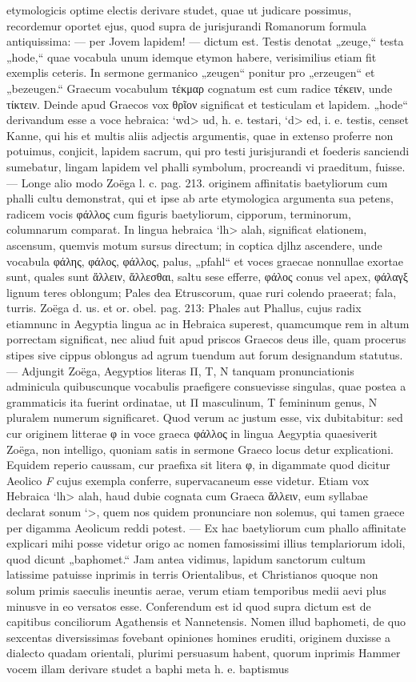 \documentclass[a4paper, 11pt, oneside, polutonikogreek, german]{article}
\begin{document}
etymologicis optime electis derivare studet, quae ut judicare possimus, recordemur oportet ejus, quod supra de jurisjurandi Romanorum formula antiquissima: --- per Jovem lapidem! --- dictum est. Testis denotat „zeuge,“ testa „hode,“ quae vocabula unum idemque etymon habere, verisimilius etiam fit exemplis ceteris. In sermone germanico „zeugen“ ponitur pro „erzeugen“ et „bezeugen.“ Graecum vocabulum τέκμαρ cognatum est cum radice τέκειν, unde τίκτειν. Deinde apud Graecos vox θρῖον significat et testiculam et lapidem. „hode“ derivandum esse a voce hebraica: \<`wd> ud, h. e. testari, \<`d> ed, i. e. testis, censet Kanne, qui his et multis aliis adjectis argumentis, quae in extenso proferre non potuimus, conjicit, lapidem sacrum, qui pro testi jurisjurandi et foederis sanciendi sumebatur, lingam lapidem vel phalli symbolum, procreandi vi praeditum, fuisse. --- Longe alio modo Zoëga l. c. pag. 213. originem affinitatis baetyliorum cum phalli cultu demonstrat, qui et ipse ab arte etymologica argumenta sua petens, radicem vocis φάλλος cum figuris baetyliorum, cipporum, terminorum, columnarum comparat. In lingua hebraica \<`lh> alah, significat elationem, ascensum, quemvis motum sursus directum; in coptica \textcoptic{djlhz} ascendere, unde vocabula φάλης, φάλος, φάλλος, palus, „pfahl“ et voces graecae nonnullae exortae sunt, quales sunt ἅλλειν, ἅλλεσθαι, saltu sese efferre, φάλος conus vel apex, φάλαγξ lignum teres oblongum; Pales dea Etruscorum, quae ruri colendo praeerat; fala, turris. Zoëga d. us. et or. obel. pag. 213: Phales aut Phallus, cujus radix etiamnunc in Aegyptia lingua ac in Hebraica superest, quamcumque rem in altum porrectam significat, nec aliud fuit apud priscos Graecos deus ille, quam procerus stipes sive cippus oblongus ad agrum tuendum aut forum designandum statutus. --- Adjungit Zoëga, Aegyptios literas Π, Τ, Ν tanquam pronunciationis adminicula quibuscunque vocabulis praefigere consuevisse singulas, quae postea a grammaticis ita fuerint ordinatae, ut Π masculinum, Τ femininum genus, Ν pluralem numerum significaret. Quod verum ac justum esse, vix dubitabitur: sed cur originem litterae φ in voce graeca φάλλος in lingua Aegyptia quaesiverit Zoëga, non intelligo, quoniam satis in sermone Graeco locus detur explicationi. Equidem reperio caussam, cur praefixa sit litera φ, in digammate quod dicitur Aeolico \emph{F} cujus exempla conferre, supervacaneum esse videtur. Etiam vox Hebraica \<`lh> alah, haud dubie cognata cum Graeca ἅλλειν, eum syllabae declarat sonum \<`>, quem nos quidem pronunciare non solemus, qui tamen graece per digamma Aeolicum reddi potest. --- Ex hac baetyliorum cum phallo affinitate explicari mihi posse videtur origo ac nomen famosissimi illius templariorum idoli, quod dicunt „baphomet.“ Jam antea vidimus, lapidum sanctorum cultum latissime patuisse inprimis in terris Orientalibus, et Christianos quoque non solum primis saeculis ineuntis aerae, verum etiam temporibus medii aevi plus minusve in eo versatos esse. Conferendum est id quod supra dictum est de capitibus conciliorum Agathensis et Nannetensis. Nomen illud baphometi, de quo sexcentas diversissimas fovebant opiniones homines eruditi, originem duxisse a dialecto quadam orientali, plurimi persuasum habent, quorum inprimis Hammer vocem illam derivare studet a baphi meta h. e. baptismus 
\end{document}
